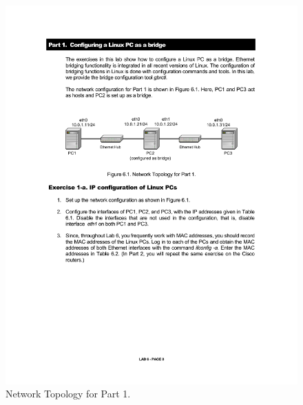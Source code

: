 \begin{figure}[h!t]
	\centering
	\includegraphics[width=\linewidth]{graphics/lab6-network1.pdf}
	\caption{Network Topology for Part 1.}
	\label{fig:lab6-network1}
\end{figure}

